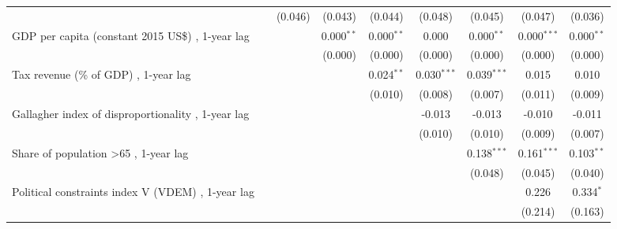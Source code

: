 \begin{table}[htbp]
\begin{tabular}{lcccccccc}
                                                                                                   &         & (0.046) & (0.043)      & (0.044)       & (0.048)       & (0.045)       & (0.047)       & (0.036)\\   
      GDP per capita (constant 2015 US\$) , 1-year lag                                             &         &         & 0.000$^{**}$ & 0.000$^{**}$  & 0.000         & 0.000$^{**}$  & 0.000$^{***}$ & 0.000$^{**}$\\   
                                                                                                   &         &         & (0.000)      & (0.000)       & (0.000)       & (0.000)       & (0.000)       & (0.000)\\   
      Tax revenue (\% of GDP) , 1-year lag                                                         &         &         &              & 0.024$^{**}$  & 0.030$^{***}$ & 0.039$^{***}$ & 0.015         & 0.010\\   
                                                                                                   &         &         &              & (0.010)       & (0.008)       & (0.007)       & (0.011)       & (0.009)\\   
      Gallagher index of disproportionality , 1-year lag                                           &         &         &              &               & -0.013        & -0.013        & -0.010        & -0.011\\   
                                                                                                   &         &         &              &               & (0.010)       & (0.010)       & (0.009)       & (0.007)\\   
      Share of population >65 , 1-year lag                                                         &         &         &              &               &               & 0.138$^{***}$ & 0.161$^{***}$ & 0.103$^{**}$\\   
                                                                                                   &         &         &              &               &               & (0.048)       & (0.045)       & (0.040)\\   
      Political constraints index V (VDEM) , 1-year lag                                            &         &         &              &               &               &               & 0.226         & 0.334$^{*}$\\   
                                                                                                   &         &         &              &               &               &               & (0.214)       & (0.163)\\   

\end{tabular}
\end{table}
